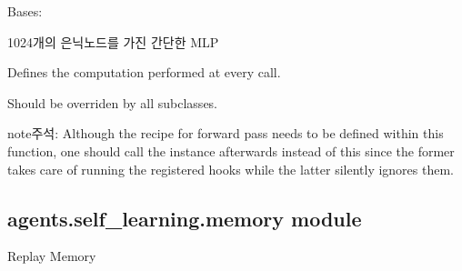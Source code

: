 \documentclass[letterpaper,10pt,english]{sphinxmanual}
\begin{document}

\begin{fulllineitems}
\label{\detokenize{agents.self_learning:agents.self_learning.models.L1024r}}
Bases: 

1024개의 은닉노드를 가진 간단한 MLP

\begin{fulllineitems}
\label{\detokenize{agents.self_learning:agents.self_learning.models.L1024r.forward}}
Defines the computation performed at every call.

Should be overriden by all subclasses.

\begin{sphinxadmonition}{note}{주석:}
Although the recipe for forward pass needs to be defined within
this function, one should call the  instance afterwards
instead of this since the former takes care of running the
registered hooks while the latter silently ignores them.
\end{sphinxadmonition}

\end{fulllineitems}


\end{fulllineitems}


\begin{fulllineitems}
\label{\detokenize{agents.self_learning:agents.self_learning.models.weights_init}}
\end{fulllineitems}



\subsection{agents.self\_learning.memory module}
\label{\detokenize{agents.self_learning:agents-self-learning-memory-module}}\label{\detokenize{agents.self_learning:module-agents.self_learning.memory}}
Replay Memory
\end{document}
